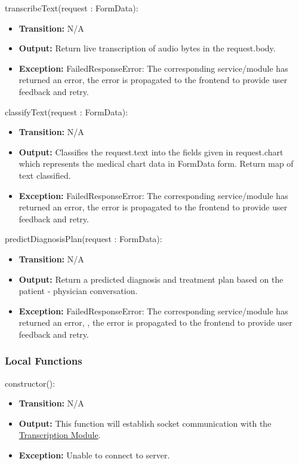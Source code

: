 \documentclass[12pt, titlepage]{article}
\begin{document}
\noindent transcribeText(request : FormData):
\begin{itemize}
    \item \textbf{Transition:} N/A
    \item \textbf{Output:} Return live transcription of audio bytes in the request.body.
    \item \textbf{Exception:} FailedResponseError: The corresponding service/module has returned an error, the error is propagated to the frontend to provide user feedback and retry.
\end{itemize}

\noindent classifyText(request : FormData):
\begin{itemize}
    \item \textbf{Transition:} N/A
    \item \textbf{Output:} Classifies the request.text into the fields given in request.chart which represents the medical chart data in FormData form. Return map of text classified. 
    \item \textbf{Exception:} FailedResponseError: The corresponding service/module has returned an error, the error is propagated to the frontend to provide user feedback and retry.
\end{itemize}

\noindent predictDiagnosisPlan(request : FormData):
\begin{itemize}
    \item \textbf{Transition:} N/A
    \item \textbf{Output:} Return a predicted diagnosis and treatment plan based on the patient - physician conversation.
    \item \textbf{Exception:} FailedResponseError: The corresponding service/module has returned an error, , the error is propagated to the frontend to provide user feedback and retry.
\end{itemize}


\subsubsection{Local Functions}

\noindent constructor():
\begin{itemize}
    \item \textbf{Transition:} N/A
    \item \textbf{Output:} This function will establish socket communication with the \hyperref[Transcription_Module]{Transcription Module}.
    \item \textbf{Exception:} Unable to connect to server.
\end{itemize}
\end{document}
